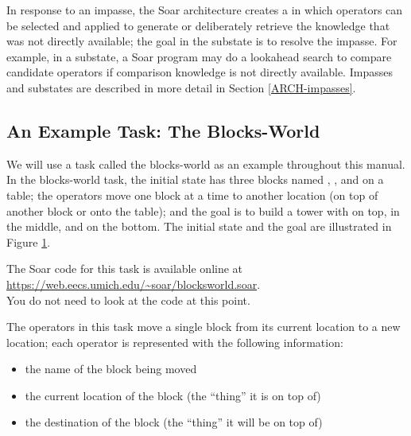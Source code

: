 In response to an impasse, the Soar architecture creates a  in which operators can be selected and applied to generate or deliberately retrieve the knowledge that was not directly available; the goal in the substate is to resolve the impasse. For example, in a substate, a Soar program may do a lookahead search to compare candidate operators if comparison knowledge is not directly available.  Impasses and substates are described in more detail in Section \ref{ARCH-impasses}.


\subsection{An Example Task: The Blocks-World}

We will use a task called the blocks-world as an example throughout this manual. In the blocks-world task, the initial state has three blocks named , , and  on a table; the operators move one block at a time to another location (on top of another block or onto the table); and the goal is to build a tower with  on top,  in the middle, and  on the bottom. The initial state and the goal are illustrated in Figure \ref{fig:blocks}.

The Soar code for this task is available online at \\
\url{https://web.eecs.umich.edu/~soar/blocksworld.soar}. \\
You do not need to look at the code at this point.

\begin{figure}
	\label{fig:blocks}
\end{figure}

The operators in this task move a single block from its current location to a new location; each operator is represented with the following information: 

\vspace{-12pt}
\begin{itemize}
	\item the name of the block being moved
	\vspace{-9pt}
	\item the current location of the block (the ``thing'' it is on top of) 
	\vspace{-9pt}
	\item the destination of the block (the ``thing'' it will be on top of) 
	\vspace{-9pt}
\end{itemize}

